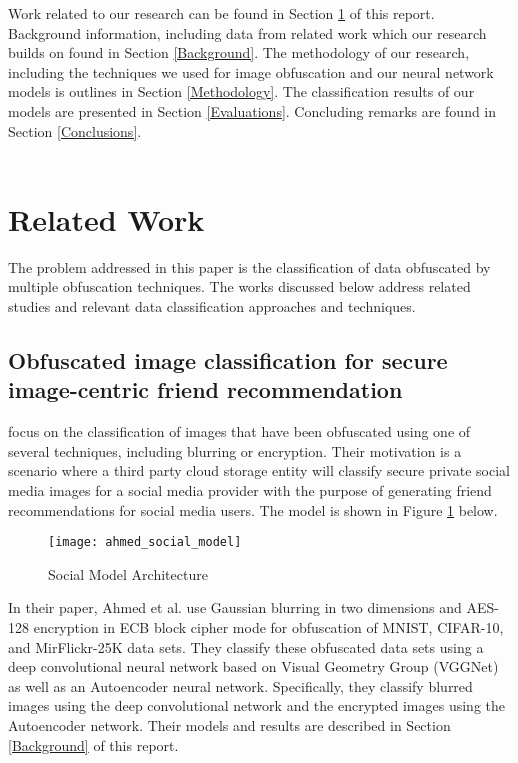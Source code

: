 \documentclass[12pt, titlepage]{article}
\begin{document}
\noindent Work related to our research can be found in Section \ref{RelatedWork} of this report. Background information, including data from related work which our research builds on found in Section \ref{Background}. The methodology of our research, including the techniques we used for image obfuscation and our neural network models is outlines in Section \ref{Methodology}. The classification results of our models are presented in Section \ref{Evaluations}. Concluding remarks are found in Section \ref{Conclusions}.\\

~\newpage
\section{Related Work}\label{RelatedWork}
The problem addressed in this paper is the classification of data obfuscated by multiple obfuscation techniques. The works discussed below address related studies and relevant data classification approaches and techniques.

\subsection{Obfuscated image classification for secure image-centric friend recommendation}

\noindent \cite{ahmed2018obfuscated} focus on the classification of images that have been obfuscated using one of several techniques, including blurring or encryption. Their motivation is a scenario where a third party cloud storage entity will classify secure private social media images for a social media provider with the purpose of generating friend recommendations for social media users. The model is shown in Figure \ref{Ahmed_social_model} below.
	
	\begin{figure}[h!]
		\begin{center}
			\texttt{[image: ahmed\_social\_model]}
			\caption{Social Model Architecture}
			\label{Ahmed_social_model}
		\end{center}
	\end{figure}
	
\noindent In their paper, Ahmed et al. use Gaussian blurring in two dimensions and AES-128 encryption in ECB block cipher mode for obfuscation of MNIST, CIFAR-10, and MirFlickr-25K data sets. They classify these obfuscated data sets using a deep convolutional neural network based on \cite{simonyan2014very} Visual Geometry Group (VGGNet) as well as an Autoencoder neural network. Specifically, they classify blurred images using the deep convolutional network and the encrypted images using the Autoencoder network. Their models and results are described in Section \ref{Background} of this report. \\
	
\end{document}
